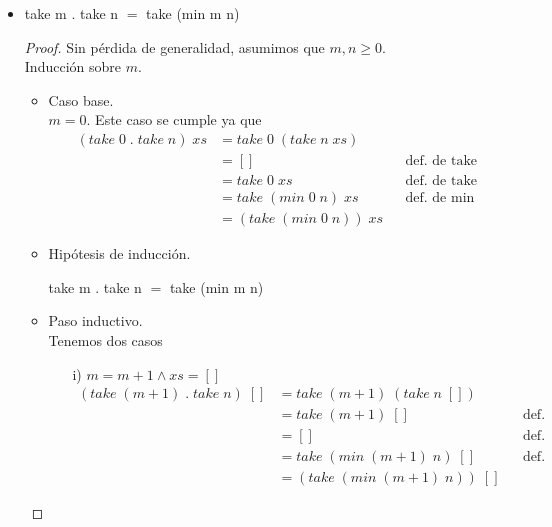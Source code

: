 \documentclass[letterpaper,11pt]{article}
\begin{document}
\begin{enumerate}
\begin{itemize}
        \item take m . take n $=$ take (min m n)
        \begin{proof}
            Sin pérdida de generalidad, asumimos que $m, n \geq 0$. \\ 
            Inducción sobre $m$.
            \begin{itemize}
                \item Caso base. \\ 
                $m = 0$. Este caso se cumple ya que 
                \begin{align*}
                    (take \; 0 \; . \; take \; n) \; xs
                    &= take \; 0 \; (take \; n \; xs) \\
                    &= [] 
                    && \text{def. de take} \\
                    &= take \; 0 \; xs 
                    && \text{def. de take} \\ 
                    &= take \; (min \; 0 \; n) \; xs 
                    && \text{def. de min} \\ 
                    &= (take \; (min \; 0 \; n)) \; xs
                \end{align*}

                \item Hipótesis de inducción.
                \begin{center}
                    take m . take n $=$ take (min m n)
                \end{center}
                
                \item Paso inductivo. \\ 
                Tenemos dos casos 
                \begin{itemize}
                    \item[i)] $m = m+1 \land xs = []$
                    \begin{align*}
                        (take \; (m+1) \; . \; take \; n) \; []
                        &= take \; (m+1) \; (take \; n \; []) \\ 
                        &= take \; (m+1) \; []
                        && \text{def. de take} \\ 
                        &= []
                        && \text{def. de take} \\
                        &= take \; (min \; (m+1) \; n) \; []
                        && \text{def. de take} \\ 
                        &= (take \; (min \; (m+1) \; n)) \; []
                    \end{align*}


\end{itemize}
\end{itemize}
\end{proof}
\end{itemize}
\end{enumerate}
\end{document}
